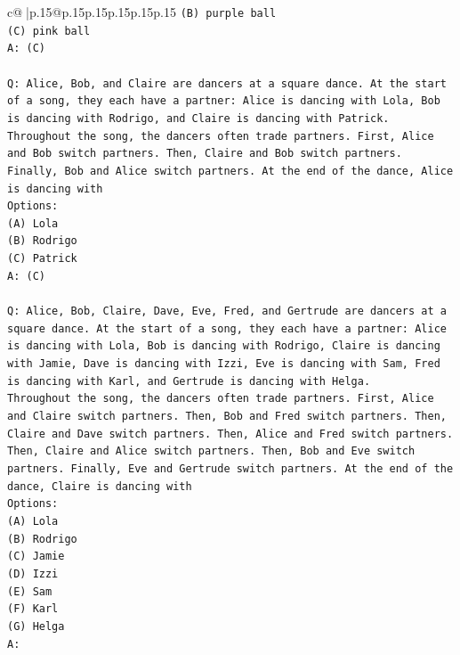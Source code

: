 \documentclass{article}
\begin{document}
{\begin{supertabular}{c@{$\;$}|p{.15\linewidth}@{}p{.15\linewidth}p{.15\linewidth}p{.15\linewidth}p{.15\linewidth}p{.15\linewidth}}
{{{\texttt{(B) purple ball} \\
\texttt{(C) pink ball} \\
\texttt{A: (C)} \\
\\ 
\texttt{Q: Alice, Bob, and Claire are dancers at a square dance. At the start of a song, they each have a partner: Alice is dancing with Lola, Bob is dancing with Rodrigo, and Claire is dancing with Patrick.} \\
\texttt{Throughout the song, the dancers often trade partners. First, Alice and Bob switch partners. Then, Claire and Bob switch partners. Finally, Bob and Alice switch partners. At the end of the dance, Alice is dancing with} \\
\texttt{Options:} \\
\texttt{(A) Lola} \\
\texttt{(B) Rodrigo} \\
\texttt{(C) Patrick} \\
\texttt{A: (C)} \\
\\ 
\texttt{Q: Alice, Bob, Claire, Dave, Eve, Fred, and Gertrude are dancers at a square dance. At the start of a song, they each have a partner: Alice is dancing with Lola, Bob is dancing with Rodrigo, Claire is dancing with Jamie, Dave is dancing with Izzi, Eve is dancing with Sam, Fred is dancing with Karl, and Gertrude is dancing with Helga.} \\
\texttt{Throughout the song, the dancers often trade partners. First, Alice and Claire switch partners. Then, Bob and Fred switch partners. Then, Claire and Dave switch partners. Then, Alice and Fred switch partners. Then, Claire and Alice switch partners. Then, Bob and Eve switch partners. Finally, Eve and Gertrude switch partners. At the end of the dance, Claire is dancing with} \\
\texttt{Options:} \\
\texttt{(A) Lola} \\
\texttt{(B) Rodrigo} \\
\texttt{(C) Jamie} \\
\texttt{(D) Izzi} \\
\texttt{(E) Sam} \\
\texttt{(F) Karl} \\
\texttt{(G) Helga} \\
\texttt{A:} \\
            }
        }
    }
     \\ \\


\end{supertabular}}
\end{document}
